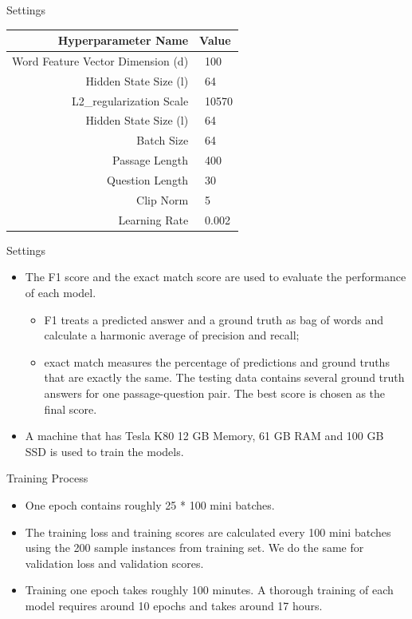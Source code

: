 \documentclass{beamer}
\begin{document}
\begin{frame}{Settings}
    \begin{table}[htbp]\centering

      \begin{tabular}{|r|l|} \hline
        Hyperparameter Name& Value \\ \hline\hline
        Word Feature Vector Dimension (d) & \ 100 \\
        Hidden State Size (l) & \ 64 \\
        L2\_regularization Scale & \ 10570\\
        Hidden State Size (l) & \ 64\\
        Batch Size & \ 64\\
        Passage Length & \ 400\\
        Question Length & \ 30\\
        Clip Norm & \ 5\\
        Learning Rate & \ 0.002 \\ \hline
      \end{tabular}
    \end{table}
\end{frame}

\begin{frame}{Settings}
    \begin{itemize}
        \item The F1 score and the exact match score are used to evaluate the performance of each model.
            \begin{itemize}
                \item F1 treats a predicted answer and a ground truth as bag of words and calculate a harmonic average of precision and recall;
                \item exact match measures the percentage of predictions and ground truths that are exactly the same. The testing data contains several ground truth answers for one passage-question pair. The best score is chosen as the final score.
            \end{itemize}
        \item A machine that has Tesla K80 12 GB Memory, 61 GB RAM and 100 GB SSD is used to train the models.
    \end{itemize}
\end{frame}

\begin{frame}{Training Process}
    \begin{itemize}
        \item One epoch contains roughly 25 * 100 mini batches.
        \item The training loss and training scores are calculated every 100 mini batches using the 200 sample instances from training set. We do the same for validation loss and validation scores.
        \item Training one epoch takes roughly 100 minutes. A thorough training of each model requires around 10 epochs and takes around 17 hours.
    \end{itemize}
\end{frame}
\end{document}

